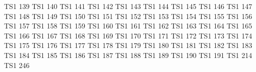 \exchardef  \excentoldstyle          TS1  139
\exchardef  \exflorin                TS1  140
\exchardef  \excolonmonetary         TS1  141
\exchardef  \exwon                   TS1  142
\exchardef  \exnaira                 TS1  143
\exchardef  \exguarani               TS1  144
\exchardef  \expeso                  TS1  145
\exchardef  \exlira                  TS1  146
\exchardef  \exrecipe                TS1  147
\exchardef  \exinterrobang           TS1  148
\exchardef  \exinterrobangdown       TS1  149
\exchardef  \exdong                  TS1  150
\exchardef  \extrademark             TS1  151
\exchardef  \expertenthousand        TS1  152
\exchardef  \expilcrow               TS1  153
\exchardef  \exbaht                  TS1  154
\exchardef  \exnumero                TS1  155
\exchardef  \exdiscount              TS1  156
\exchardef  \exestimated             TS1  157
\exchardef  \exopenbullet            TS1  158
\exchardef  \exservicemark           TS1  159
\exchardef  \exlquill                TS1  160
\exchardef  \exrquill                TS1  161
\exchardef  \excent                  TS1  162
\exchardef  \exsterling              TS1  163
\exchardef  \excurrency              TS1  164
\exchardef  \exyen                   TS1  165
\exchardef  \exbrokenbar             TS1  166
\exchardef  \exsection               TS1  167
\exchardef  \exasciidieresis         TS1  168
\exchardef  \excopyright             TS1  169
\exchardef  \exordfeminine           TS1  170
\exchardef  \excopyleft              TS1  171
\exchardef  \exlnot                  TS1  172
\exchardef  \excircledP              TS1  173
\exchardef  \exregistered            TS1  174
\exchardef  \exasciimacron           TS1  175
\exchardef  \exdegree                TS1  176
\exchardef  \expm                    TS1  177
\exchardef  \extwosuperior           TS1  178
\exchardef  \exthreesuperior         TS1  179
\exchardef  \exasciiacute            TS1  180
\exchardef  \exmu                    TS1  181
\exchardef  \exparagraph             TS1  182
\exchardef  \experiodcentered        TS1  183
\exchardef  \exreferencemark         TS1  184
\exchardef  \exonesuperior           TS1  185
\exchardef  \exordmasculine          TS1  186
\exchardef  \exsurd                  TS1  187
\exchardef  \exonequarter            TS1  188
\exchardef  \exonehalf               TS1  189
\exchardef  \exthreequarters         TS1  190
\exchardef  \exeuro                  TS1  191
\exchardef  \extimes                 TS1  214
\exchardef  \exdiv                   TS1  246

\endinput

